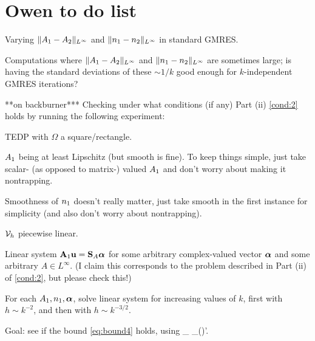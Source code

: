 \section*{Owen to do list}
\ben
\item Varying  $\|A_{1}-A_{2}\|_{L^\infty}$ and $\|n_{1}-n_{2}\|_{L^\infty}$ in standard GMRES.
\item Computations where $\|A_{1}-A_{2}\|_{L^\infty}$ and $\|n_{1}-n_{2}\|_{L^\infty}$ are sometimes large; is having the standard deviations of these $\sim 1/k$ good enough for $k$-independent GMRES iterations?
\item ***on backburner*** Checking under what conditions (if any) Part (ii) \cref{cond:2} holds by running the following experiment:
\bit
\item TEDP with $\Omega$ a square/rectangle.
\item $A_{1}$ being at least Lipschitz (but smooth is fine). To keep things simple, just take scalar- (as opposed to matrix-) valued $A_{1}$ and don't worry about making it nontrapping.
\item Smoothness of $n_{1}$ doesn't really matter, just take smooth in the first instance for simplicity (and also don't worry about nontrapping).
\item $\mathcal V_h$ piecewise linear.
\item Linear system $\mathbf{A}_{1} \mathbf{u} = \mathbf{S}_{A} {\boldsymbol{\alpha}}$ for some arbitrary complex-valued vector ${\boldsymbol{\alpha}}$ and some arbitrary $A\in L^\infty$. (I claim this corresponds to the problem described in Part (ii) of \cref{cond:2},  but please check this!)
\item For each $A_{1}, n_{1}, {\boldsymbol{\alpha}}$, solve linear system for increasing values of $k$, first with $h\sim k^{-2}$, and then with $h\sim k^{-3/2}$.
\item Goal: see if the bound \cref{eq:bound4} holds, using 
\beqs
{}_{\LtDR} \quad {} \quad {}_{(\HokDR)'}.
\eeqs
\eit
\een

